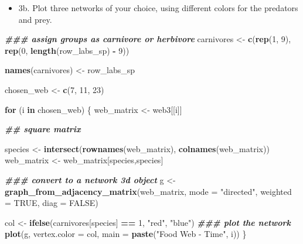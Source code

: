 \documentclass[
]{article}
\newenvironment{Shaded}{\begin{snugshade}}{\end{snugshade}}
\newcommand{\AttributeTok}[1]{\textcolor[rgb]{0.13,0.29,0.53}{#1}}
\newcommand{\ConstantTok}[1]{\textcolor[rgb]{0.56,0.35,0.01}{#1}}
\newcommand{\ControlFlowTok}[1]{\textcolor[rgb]{0.13,0.29,0.53}{\textbf{#1}}}
\newcommand{\DecValTok}[1]{\textcolor[rgb]{0.00,0.00,0.81}{#1}}
\newcommand{\DocumentationTok}[1]{\textcolor[rgb]{0.56,0.35,0.01}{\textbf{\textit{#1}}}}
\newcommand{\FunctionTok}[1]{\textcolor[rgb]{0.13,0.29,0.53}{\textbf{#1}}}
\newcommand{\NormalTok}[1]{#1}
\newcommand{\OtherTok}[1]{\textcolor[rgb]{0.56,0.35,0.01}{#1}}
\newcommand{\SpecialCharTok}[1]{\textcolor[rgb]{0.81,0.36,0.00}{\textbf{#1}}}
\newcommand{\StringTok}[1]{\textcolor[rgb]{0.31,0.60,0.02}{#1}}
\providecommand{\tightlist}{%
  \setlength{\itemsep}{0pt}\setlength{\parskip}{0pt}}
\begin{document}
\begin{itemize}
\tightlist
\item
  3b. Plot three networks of your choice, using different colors for the
  predators and prey.
\end{itemize}

\begin{Shaded}
\begin{Highlighting}[]
\DocumentationTok{\#\#\#  assign groups as carnivore or herbivore}
\NormalTok{carnivores }\OtherTok{\textless{}{-}} \FunctionTok{c}\NormalTok{(}\FunctionTok{rep}\NormalTok{(}\DecValTok{1}\NormalTok{, }\DecValTok{9}\NormalTok{), }\FunctionTok{rep}\NormalTok{(}\DecValTok{0}\NormalTok{, }\FunctionTok{length}\NormalTok{(row\_labs\_sp) }\SpecialCharTok{{-}} \DecValTok{9}\NormalTok{))}

\FunctionTok{names}\NormalTok{(carnivores) }\OtherTok{\textless{}{-}}\NormalTok{ row\_labs\_sp}

\NormalTok{chosen\_web }\OtherTok{\textless{}{-}} \FunctionTok{c}\NormalTok{(}\DecValTok{7}\NormalTok{, }\DecValTok{11}\NormalTok{, }\DecValTok{23}\NormalTok{)}

\ControlFlowTok{for}\NormalTok{ (i }\ControlFlowTok{in}\NormalTok{ chosen\_web) \{}
\NormalTok{  web\_matrix }\OtherTok{\textless{}{-}}\NormalTok{ web3[[i]]}


\DocumentationTok{\#\# square matrix}

\NormalTok{species }\OtherTok{\textless{}{-}} \FunctionTok{intersect}\NormalTok{(}\FunctionTok{rownames}\NormalTok{(web\_matrix), }\FunctionTok{colnames}\NormalTok{(web\_matrix))}
\NormalTok{web\_matrix }\OtherTok{\textless{}{-}}\NormalTok{ web\_matrix[species,species]}

  
  \DocumentationTok{\#\#\#  convert to a network 3d object}
\NormalTok{g }\OtherTok{\textless{}{-}} \FunctionTok{graph\_from\_adjacency\_matrix}\NormalTok{(web\_matrix, }\AttributeTok{mode =} \StringTok{"directed"}\NormalTok{, }\AttributeTok{weighted =} \ConstantTok{TRUE}\NormalTok{, }\AttributeTok{diag =} \ConstantTok{FALSE}\NormalTok{)}

\NormalTok{col }\OtherTok{\textless{}{-}} \FunctionTok{ifelse}\NormalTok{(carnivores[species] }\SpecialCharTok{==} \DecValTok{1}\NormalTok{, }\StringTok{"red"}\NormalTok{, }\StringTok{"blue"}\NormalTok{)}
  \DocumentationTok{\#\#\#  plot the network}
  \FunctionTok{plot}\NormalTok{(g, }\AttributeTok{vertex.color =}\NormalTok{ col, }\AttributeTok{main =} \FunctionTok{paste}\NormalTok{(}\StringTok{"Food Web {-} Time"}\NormalTok{, i))}
\NormalTok{\}}
\end{Highlighting}
\end{Shaded}
\end{document}
